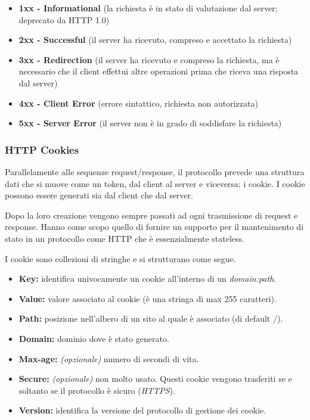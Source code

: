 \begin{itemize}
    \item \textbf{1xx - Informational} (la richiesta è in stato di valutazione dal server; deprecato da HTTP 1.0)
    \item \textbf{2xx - Successful} (il server ha ricevuto, compreso e accettato la richiesta)
    \item \textbf{3xx - Redirection} (il server ha ricevuto e compreso la richiesta, ma è necessario che il client effettui altre operazioni prima che riceva una risposta dal server)
    \item \textbf{4xx - Client Error} (errore sintattico, richiesta non autorizzata)
    \item \textbf{5xx - Server Error} (il server non è in grado di soddisfare la richiesta)
\end{itemize}

\subsubsection{HTTP Cookies}

Parallelamente alle sequenze request/response, il protocollo prevede una struttura dati che si muove come un token, dal client al server e viceversa: i cookie. I cookie possono essere generati sia dal client che dal server. 

Dopo la loro creazione vengono sempre passati ad ogni trasmissione di request e response. Hanno come scopo quello di fornire un supporto per il mantenimento di stato in un protocollo come HTTP che è essenzialmente stateless. 

I cookie sono collezioni di stringhe e si strutturano come segue.

\begin{itemize}
    \item
    \textbf{Key:} identifica univocamente un cookie all’interno di un \textit{domain:path}.
    
    \item
    \textbf{Value:} valore associato al cookie (è una stringa di max 255 caratteri).
    
    \item
    \textbf{Path:} posizione nell’albero di un sito al quale è associato (di default \(/\)).
    
    \item
    \textbf{Domain:} dominio dove è stato generato.
    
    \item
    \textbf{Max-age:} \textit{(opzionale)} numero di secondi di vita.
    
    \item
    \textbf{Secure:} \textit{(opzionale)} non molto usato. Questi cookie vengono trasferiti se e soltanto se il protocollo è sicuro (\textit{HTTPS}).

    \item
    \textbf{Version:} identifica la versione del protocollo di gestione dei cookie.
    
\end{itemize}

